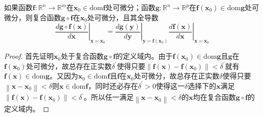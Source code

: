 \documentclass[main.tex]{subfiles}
\begin{document}
\begin{theorem}[链式法则]
如果函数$\mathbf{f}:\mathbb{R}^n\rightarrow\mathbb{R}^m$在$\mathbf{x}_0\in\mathrm{dom}\mathbf{f}$处可微分；函数$\mathbf{g}:\mathbb{R}^n\rightarrow\mathbb{R}^p$在$\mathbf{f}\left(\mathbf{x}_0\right)\in\mathrm{dom}\mathbf{g}$处可微分，则复合函数$\mathbf{g}\circ\mathbf{f}$在$\mathbf{x}_0$处可微分，且其全导数
\[
\left.\frac{d\mathbf{g}\circ\mathbf{f}\left(\mathbf{x}\right)}{d\mathbf{x}}\right|_{\mathbf{x}=\mathbf{x}_0}=\left.\frac{d\mathbf{g}\left(\mathbf{y}\right)}{d\mathbf{y}}\right|_{\mathbf{y}=\mathbf{f}\left(\mathbf{x}_0\right)}\left.\frac{d\mathbf{f}\left(\mathbf{x}\right)}{d\mathbf{x}}\right|_{\mathbf{x}=\mathbf{x}_0}
\]
\end{theorem}
\begin{proof}
首先证明$\mathbf{x}_0$处于复合函数$\mathbf{g}\circ\mathbf{f}$的定义域内。由于$\mathbf{f}\left(\mathbf{x}_0\right)\in\mathrm{dom}\mathbf{g}$且$\mathbf{g}$在$\mathbf{f}\left(\mathbf{x}_0\right)$处可微分，故总存在正实数$\delta^\prime$使得只要$\left\|\mathbf{f}\left(\mathbf{x}\right)-\mathbf{f}\left(\mathbf{x}_0\right)\right\|<\delta^\prime$就有$\mathbf{f}\left(\mathbf{x}\right)\in\mathrm{dom}\mathbf{g}$。又因为$\mathbf{x}_0\in\mathrm{dom}\mathbf{f}$且$\mathbf{f}$在$\mathbf{x}_0$处可微分，故总存在正实数$\delta$使得只要$\left\|\mathbf{x}-\mathbf{x}_0\right\|<\delta$则$\mathbf{x}\in\mathrm{dom}\mathbf{f}$，同时还必存在$\delta^\prime>0$使得这一$\delta$选择下的$\mathbf{x}$满足$\left\|\mathbf{f}\left(\mathbf{x}\right)-\mathbf{f}\left(\mathbf{x}_0\right)\right\|<\delta^\prime$。所以任一满足$\left\|\mathbf{x}-\mathbf{x}_0\right\|<\delta$的$\mathbf{x}$均在复合函数$\mathbf{g}\circ\mathbf{f}$的定义域内。


\end{proof}
\end{document}
